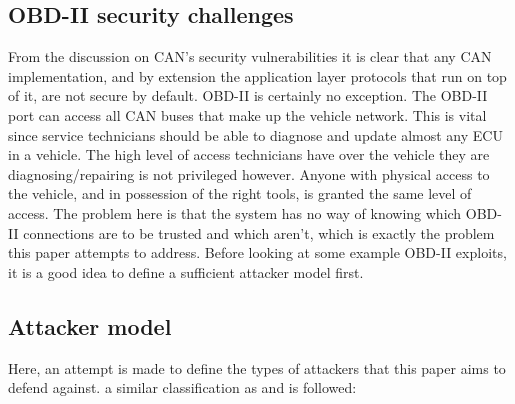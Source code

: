 \documentclass[master=cws,masteroption=vs,english]{kulemt}
\begin{document}
\subsection{OBD-II security challenges}
\label{sec:obd_challenges}

 From the discussion on CAN's security vulnerabilities it is clear that any CAN implementation, and by extension the application layer protocols that run on top of it, are not secure by default. OBD-II is certainly no exception. The OBD-II port can access all CAN buses that make up the vehicle network. This is vital since service technicians should be able to diagnose and update almost any ECU in a vehicle\cite{Kosher}. The high level of access technicians have over the vehicle they are diagnosing/repairing is not privileged however. Anyone with physical access to the vehicle, and in possession of the right tools, is granted the same level of access. The problem here is that the system has no way of knowing which OBD-II connections are to be trusted and which aren't, which is exactly the problem this paper attempts to address. Before looking at some example OBD-II exploits, it is a good idea to define a sufficient attacker model first.

\subsection{Attacker model} 
\label{sec:attacker_model}
Here, an attempt is made to define the types of attackers that this paper aims to defend against. a similar classification as \cite{Maxim} and \cite{Petit} is followed:
\end{document}
